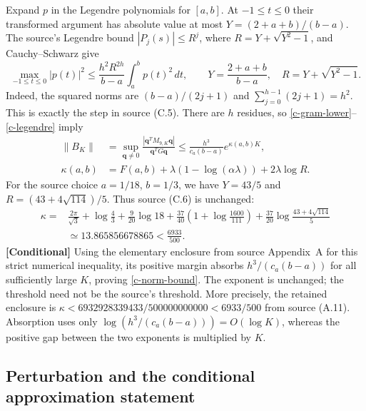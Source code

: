 Expand $p$ in the Legendre polynomials for $[a,b]$.  At $-1\leq t\leq0$
their transformed argument has absolute value at most
$Y=(2+a+b)/(b-a)$.  The source's Legendre bound $|P_j(s)|\leq R^j$,
where $R=Y+\sqrt{Y^2-1}$, and Cauchy--Schwarz give
\begin{equation}
 \max_{-1\leq t\leq0}|p(t)|^2\leq
 \frac{h^2R^{2h}}{b-a}\int_a^b p(t)^2\,dt,
 \qquad Y=\frac{2+a+b}{b-a},\quad R=Y+\sqrt{Y^2-1}.
 \label{c-legendre}
\end{equation}
Indeed, the squared norms are $(b-a)/(2j+1)$ and
$\sum_{j=0}^{h-1}(2j+1)=h^2$.  This is exactly the step in source (C.5).
There are $h$ residues, so \eqref{c-gram-lower}--\eqref{c-legendre} imply
\begin{equation}
 \begin{aligned}
 \|B_K\|&=
  \sup_{\mathbf q\ne0}
  \frac{|\mathbf q^TM_{9,K}\mathbf q|}{\mathbf q^TG\mathbf q}
  \leq\frac{h^3}{c_a(b-a)}e^{\kappa(a,b)K},\\
 \kappa(a,b)&=F(a,b)+\lambda(1-\log(\alpha\lambda))+2\lambda\log R.
 \end{aligned}
 \label{c-kappa-bound}
\end{equation}
For the source choice $a=1/18$, $b=1/3$, we have $Y=43/5$ and
$R=(43+4\sqrt{114})/5$.  Thus source (C.6) is unchanged:
\begin{equation}
 \begin{aligned}
 \kappa={}&\frac{2\pi}{\sqrt3}+\log\frac43
       +\frac9{20}\log18
       +\frac{37}{40}\left(1+\log\frac{1600}{111}\right)
       +\frac{37}{20}\log\frac{43+4\sqrt{114}}5\\
   &\simeq13.865856678865<\frac{6933}{500}.
 \end{aligned}
 \label{c-kappa-value}
\end{equation}
\noindent\textbf{[Conditional]} Using the elementary enclosure from
source Appendix~A for this strict numerical inequality, its positive
margin absorbs $h^3/(c_a(b-a))$ for all sufficiently large $K$, proving
\eqref{c-norm-bound}.  The exponent is unchanged; the threshold need
not be the source's threshold.
More precisely, the retained enclosure is
$\kappa<6932928339433/500000000000<6933/500$ from source (A.11).
Absorption uses only $\log(h^3/(c_a(b-a)))=O(\log K)$, whereas the
positive gap between the two exponents is multiplied by $K$.

\subsection{Perturbation and the conditional approximation statement}
\label{c-approximation-conditional}

